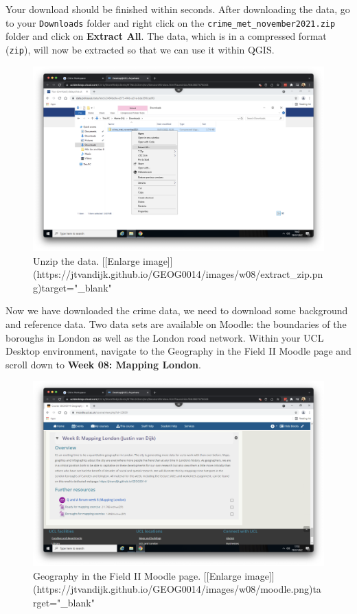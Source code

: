 \documentclass[
]{book}
\begin{document}
Your download should be finished within seconds. After downloading the data, go to your \texttt{Downloads} folder and right click on the \texttt{crime\_met\_november2021.zip} folder and click on \textbf{Extract All}. The data, which is in a compressed format (\texttt{zip}), will now be extracted so that we can use it within QGIS.

\begin{figure}

{\centering \includegraphics[width=850pt]{images/w08/extract_zip} 

}

\caption{Unzip the data. [[Enlarge image]](https://jtvandijk.github.io/GEOG0014/images/w08/extract_zip.png){target="_blank"}}\label{fig:data-police-unzip}
\end{figure}

Now we have downloaded the crime data, we need to download some background and reference data. Two data sets are available on Moodle: the boundaries of the boroughs in London as well as the London road network. Within your UCL Desktop environment, navigate to the Geography in the Field II Moodle page and scroll down to \textbf{Week 08: Mapping London}.

\begin{figure}

{\centering \includegraphics[width=850pt]{images/w08/moodle} 

}

\caption{Geography in the Field II Moodle page. [[Enlarge image]](https://jtvandijk.github.io/GEOG0014/images/w08/moodle.png){target="_blank"}}\label{fig:moodle-w8}
\end{figure}
\end{document}

